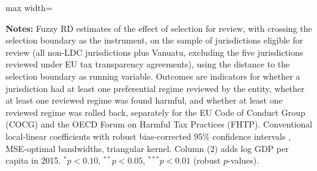 \begin{table}[t]
\begin{adjustbox}{max width=\textwidth}
\end{adjustbox}
\begin{minipage}{1\textwidth} \scriptsize
{\bf Notes:} Fuzzy RD estimates of the effect of selection for review, with crossing the selection boundary as the instrument, on the sample of jurisdictions eligible for review (all non-LDC jurisdictions plus Vanuatu, excluding the five jurisdictions reviewed under EU tax transparency agreements), using the distance to the selection boundary as running variable. Outcomes are indicators for whether a jurisdiction had at least one preferential regime reviewed by the entity, whether at least one reviewed regime was found harmful, and whether at least one reviewed regime was rolled back, separately for the EU Code of Conduct Group (COCG) and the OECD Forum on Harmful Tax Practices (FHTP). Conventional local-linear coefficients with robust bias-corrected 95\% confidence intervals \cite{calonico2014robust}, MSE-optimal bandwidths, triangular kernel. Column (2) adds log GDP per capita in 2015. $^{*}p<0.10$, $^{**}p<0.05$, $^{***}p<0.01$ (robust $p$-values).
\end{minipage}
\end{table}
